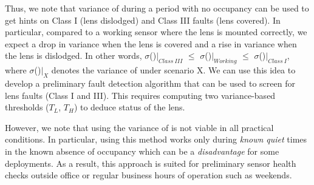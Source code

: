 Thus, we note that variance of \aout during a period with no occupancy can be used to get hints on Class I (lens dislodged) and Class III faults (lens covered). In particular, compared to a working sensor where the lens is mounted correctly, we expect a drop in variance when the lens is covered and a rise in variance when the lens is dislodged. In other words, $\sigma$(\aout)$|_{Class\ III}$ $\leq$ $\sigma$(\aout)$|_{Working}$ $\leq$ $\sigma$(\aout)$|_{Class\ I}$, where $\sigma$(\aout)$|_{X}$ denotes the variance of \aout under scenario X. We can use this idea to develop a preliminary fault detection algorithm that can be used to screen for lens faults (Class I and III). This requires computing two variance-based thresholds ($T_L$, $T_H$) to deduce status of the lens.

However, we note that using the variance of \aout is not viable in all practical conditions. In particular, using this method works only during \textit{known quiet} times \ie in the known absence of occupancy which can be a \textit{disadvantage} for some deployments. As a result, this approach is suited for preliminary sensor health checks outside office or regular business hours of operation such as weekends. %

